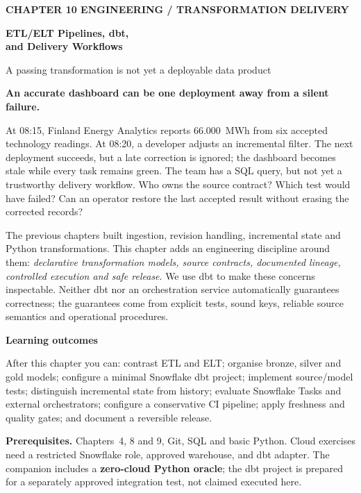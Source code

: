 \documentclass[11pt,twoside]{article}
\begin{document}
{\sffamily\bfseries\fontsize{9}{11}\selectfont\color{steelblue} CHAPTER 10 \hfill ENGINEERING / TRANSFORMATION DELIVERY}\par\vspace{3mm}
{\sffamily\bfseries\fontsize{21.2}{24.5}\selectfont\color{navy} ETL/ELT Pipelines, dbt,\\and Delivery Workflows}\par\vspace{2mm}
{\sffamily\fontsize{11.1}{14}\selectfont\color{steelblue} A passing transformation is not yet a deployable data product}\par\vspace{3mm}
\begin{insight}\textbf{An accurate dashboard can be one deployment away from a silent failure.}\par
At 08:15, Finland Energy Analytics reports 66.000~MWh from six accepted technology readings. At 08:20, a developer adjusts an incremental filter. The next deployment succeeds, but a late correction is ignored; the dashboard becomes stale while every task remains green. The team has a SQL query, but not yet a trustworthy delivery workflow. Who owns the source contract? Which test would have failed? Can an operator restore the last accepted result without erasing the corrected records?
\end{insight}
The previous chapters built ingestion, revision handling, incremental state and Python transformations. This chapter adds an engineering discipline around them: \emph{declarative transformation models, source contracts, documented lineage, controlled execution and safe release}. We use dbt to make these concerns inspectable. Neither dbt nor an orchestration service automatically guarantees correctness; the guarantees come from explicit tests, sound keys, reliable source semantics and operational procedures.
\begin{whitebox}\textbf{Learning outcomes}\par
After this chapter you can: contrast ETL and ELT; organise bronze, silver and gold models; configure a minimal Snowflake dbt project; implement source/model tests; distinguish incremental state from history; evaluate Snowflake Tasks and external orchestrators; configure a conservative CI pipeline; apply freshness and quality gates; and document a reversible release.\end{whitebox}
\textbf{Prerequisites.} Chapters~4, 8 and 9, Git, SQL and basic Python. Cloud exercises need a restricted Snowflake role, approved warehouse, and dbt adapter. The companion includes a \textbf{zero-cloud Python oracle}; the dbt project is prepared for a separately approved integration test, not claimed executed here.
\end{document}
